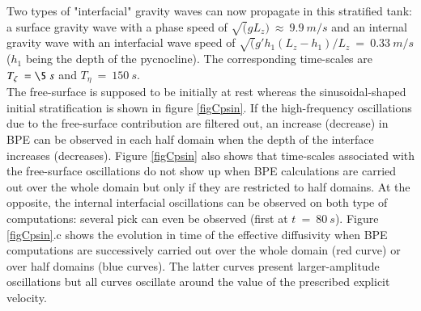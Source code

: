 Two types of "interfacial" gravity waves can now propagate in this stratified tank: a surface gravity wave with a phase speed of $\sqrt(g L_z) \ \approx \ 9.9\ m/s$ and an internal gravity wave with an interfacial wave speed of $\sqrt(g' h_1 (L_z-h_1)/L_z\ =\ 0.33\ m/s$ ($h_1$ being the depth of the pycnocline). The corresponding time-scales are $T_{\zeta} \ =\5\ s$ and $T_{\eta} \ =\ 150\ s$.\\
The free-surface is supposed to be initially at rest whereas the sinusoidal-shaped initial stratification is shown in figure \ref{figCpsin}.
If the high-frequency oscillations due to the free-surface contribution are filtered out, an increase (decrease) in BPE can be observed in each half domain when the depth of the interface increases (decreases).
Figure \ref{figCpsin} also shows that time-scales associated with the free-surface oscillations do not show up when BPE calculations are carried out over the whole domain but only if they are restricted to half domains. At the opposite, the internal interfacial oscillations can be observed on both type of computations: several pick can even be observed (first at $t\ =\ 80\ s$).
Figure \ref{figCpsin}.c shows the evolution in time of the effective diffusivity when BPE computations are successively carried out over the whole domain (red curve) or over half domains (blue curves). The latter curves present larger-amplitude oscillations but all curves oscillate around the value of the prescribed explicit velocity.

